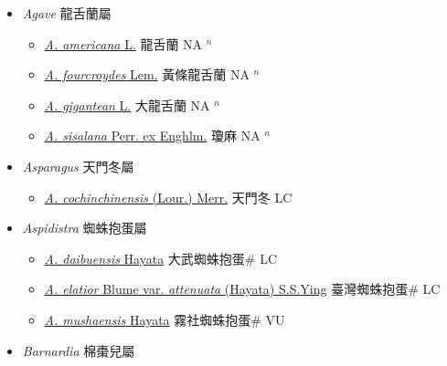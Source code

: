 
  \begin{itemize}
 \item[] \textit{Agave} 龍舌蘭屬
                    
  \begin{itemize}
        \item[] \href{http://www.theplantlist.org/tpl1.1/search?q=Agave+americana}{\textit{A. americana} L.}   龍舌蘭 NA $^n$
        \item[] \href{http://www.theplantlist.org/tpl1.1/search?q=Agave+fourcroydes}{\textit{A. fourcroydes} Lem.}   黃條龍舌蘭 NA $^n$
        \item[] \href{http://www.theplantlist.org/tpl1.1/search?q=Agave+gigantean}{\textit{A. gigantean} L.}   大龍舌蘭 NA $^n$
        \item[] \href{http://www.theplantlist.org/tpl1.1/search?q=Agave+sisalana}{\textit{A. sisalana} Perr. ex Enghlm.}   瓊麻 NA $^n$
  \end{itemize}
 \item[] \textit{Asparagus} 天門冬屬
                    
  \begin{itemize}
        \item[] \href{http://www.theplantlist.org/tpl1.1/search?q=Asparagus+cochinchinensis}{\textit{A. cochinchinensis} (Lour.) Merr.}   天門冬 LC
  \end{itemize}
 \item[] \textit{Aspidistra} 蜘蛛抱蛋屬
                    
  \begin{itemize}
        \item[] \href{http://www.theplantlist.org/tpl1.1/search?q=Aspidistra+daibuensis}{\textit{A. daibuensis} Hayata}   大武蜘蛛抱蛋\# LC
        \item[] \href{http://www.theplantlist.org/tpl1.1/search?q=Aspidistra+elatior+var.+attenuata}{\textit{A. elatior} Blume var. \textit{attenuata} (Hayata) S.S.Ying}   臺灣蜘蛛抱蛋\# LC
        \item[] \href{http://www.theplantlist.org/tpl1.1/search?q=Aspidistra+mushaensis}{\textit{A. mushaensis} Hayata}   霧社蜘蛛抱蛋\# VU
  \end{itemize}
 \item[] \textit{Barnardia} 棉棗兒屬
                    

\end{itemize}
